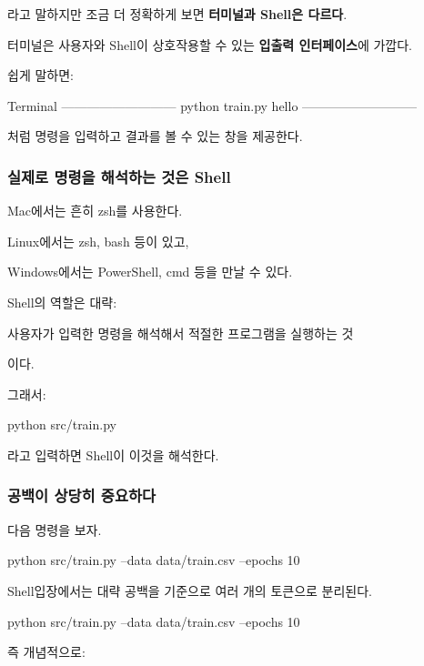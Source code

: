 라고 말하지만 조금 더 정확하게 보면 \textbf{터미널과 Shell은 다르다}.

터미널은 사용자와 Shell이 상호작용할 수 있는 \textbf{입출력 인터페이스}에 가깝다.

쉽게 말하면:
\begin{dhkzsh}
Terminal
---------------------------
python train.py 
hello
---------------------------
\end{dhkzsh}

처럼 명령을 입력하고 결과를 볼 수 있는 창을 제공한다.

\subsubsection{실제로 명령을 해석하는 것은 Shell}

Mac에서는 흔히 zsh를 사용한다.

Linux에서는 zsh, bash 등이 있고,

Windows에서는 PowerShell, cmd 등을 만날 수 있다.

Shell의 역할은 대략:

\begin{dhksmry}[centered]
사용자가 입력한 명령을 해석해서 적절한 프로그램을 실행하는 것
\end{dhksmry}

이다.

그래서:

\begin{dhkzsh}
python src/train.py
\end{dhkzsh}

라고 입력하면 Shell이 이것을 해석한다.

\subsubsection{공백이 상당히 중요하다}

다음 명령을 보자.

\begin{dhkzsh}
python src/train.py --data data/train.csv --epochs 10
\end{dhkzsh}

Shell입장에서는 대략 공백을 기준으로 여러 개의 토큰으로 분리된다.

\begin{dhkzsh}
python
src/train.py
--data
data/train.csv
--epochs
10
\end{dhkzsh}

즉 개념적으로:

\begin{dhkzsh}
\end{dhkzsh}

